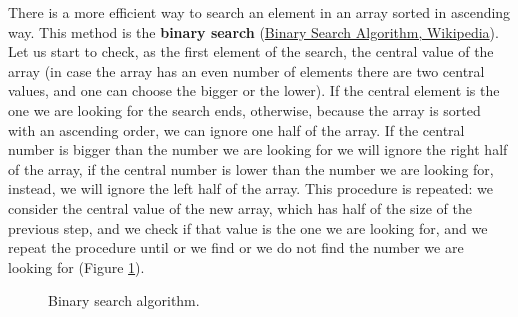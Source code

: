 There is a more efficient way to search an element in an array sorted in ascending way. This method is the \textbf{binary search} \cite{wikibinarysearch} (\href{https://en.wikipedia.org/wiki/Binary_search_algorithm}{Binary Search Algorithm, Wikipedia}).
Let us start to check, as the first element of the search, the central value of the array (in case the array has an even number of elements there are two central values, and one can choose the bigger or the lower). If the central element is the one we are looking for the search ends, otherwise, because the array is sorted with an ascending order, we can ignore one half of the array. If the central number is bigger than the number we are looking for we will ignore the right half of the array, if the central number is lower than the number we are looking for, instead, we will ignore the left half of the array. This procedure is repeated: we consider the central value of the new array, which has half of the size of the previous step, and we check if that value is the one we are looking for, and we repeat the procedure until or we find or we do not find the number we are looking for (Figure \ref{sorting_2}). 

\begin{figure}[H]
\centering
{}

\caption[Binary search algorithm.]{Binary search algorithm.}
\label{sorting_2}
\end{figure}

